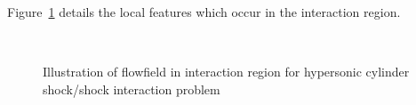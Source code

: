 Figure~\ref{fig:onera_type4_ssi_local} details the local features which occur in the interaction region.
\begin{figure}
  \begin{center}
     \\
    \caption{Illustration of flowfield in interaction region for hypersonic cylinder shock/shock interaction problem\label{fig:onera_type4_ssi_local}}
  \end{center}
\end{figure}
